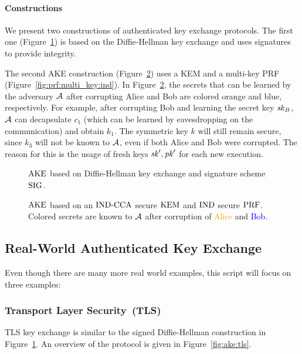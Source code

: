 \paragraph{Constructions} We present two constructions of authenticated key exchange protocols. 
The first one (Figure~\ref{fig:ake:signed_dh}) is based on the Diffie-Hellman key exchange and uses signatures to provide integrity.

The second AKE construction (Figure~\ref{fig:ake:kem}) uses a KEM and a multi-key PRF (Figure~\ref{fig:prf:multi_key:ind}). 
In Figure~\ref{fig:ake:kem}, the secrets that can be learned by the adversary $\mathcal{A}$ after corrupting Alice and Bob are colored orange and blue, respectively.
For example, after corrupting Bob and learning the secret key $\mathit{sk}_B$, $\mathcal{A}$ can decapsulate $c_1$ (which can be learned by eavesdropping on the communication) and obtain $k_1$.
The symmetric key $k$ will still remain secure, since $k_3$ will not be known to $\mathcal{A}$, even if both Alice and Bob were corrupted.
The reason for this is the usage of fresh keys $\mathit{sk}',\mathit{pk}'$ for each new execution.

\begin{figure}[!ht]
    \centering
    
    \caption{$\mathrm{AKE}$ based on Diffie-Hellman key exchange and signature scheme $\mathrm{SIG}$.}
    \label{fig:ake:signed_dh}
\end{figure}

\begin{figure}[!ht]
    \centering
    
    \caption{$\mathrm{AKE}$ based on an ${\mathrm{IND}\text{-}\mathrm{CCA}}$ secure $\mathrm{KEM}$ and ${\mathrm{IND}}$ secure $\mathrm{PRF}$. Colored secrets are known to $\mathcal{A}$ after corruption of \textcolor{orange}{Alice} and \textcolor{blue}{Bob}.}
    \label{fig:ake:kem}
\end{figure}

\subsection{Real-World Authenticated Key Exchange}
Even though there are many more real world examples, this script will focus on three examples:

\subsubsection{Transport Layer Security~(TLS) \cite{RFCTLS13}}
TLS key exchange is similar to the signed Diffie-Hellman construction in Figure~\ref{fig:ake:signed_dh}.
An overview of the protocol is given in Figure~\ref{fig:ake:tls}.

